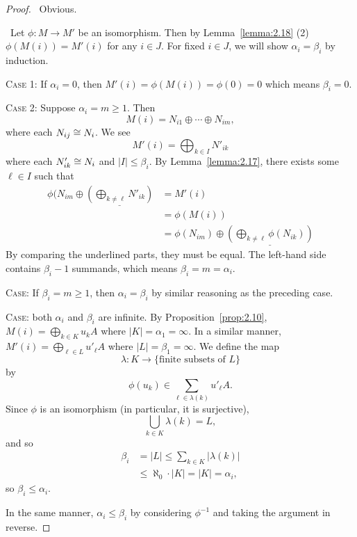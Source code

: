 \begin{proof}
\backwardproof\ Obvious.

\forwardproof\ Let $\phi\colon M\to M'$ be an isomorphism. Then by
Lemma~\ref{lemma:2.18} (2) $\phi(M(i))=M'(i)$ for any $i\in J$.
For fixed $i\in J$, we will show $\alpha_{i}=\beta_{i}$ by induction.

\textsc{Case 1}: If $\alpha_{i}=0$, then $M'(i)=\phi(M(i))=\phi(0)=0$
which means $\beta_{i}=0$.

\textsc{Case 2}: Suppose $\alpha_{i}=m\geq1$. Then
\begin{equation}
M(i)=N_{i1}\oplus\cdots\oplus N_{im},
\end{equation}
where each $N_{ij}\cong N_{i}$. We see
\begin{equation}
M'(i)=\bigoplus_{k\in I}N'_{ik}
\end{equation}
where each $N'_{ik}\cong N_{i}$ and $|I|\leq\beta_{i}$. By Lemma~\ref{lemma:2.17},
there exists some $\ell\in I$ such that
\begin{subequations}
  \begin{align}
\phi(N_{im}\oplus\underline{\left(\bigoplus_{k\neq\ell}N'_{ik}\right)}
&=M'(i)\\
&=\phi(M(i))\\
&=\phi(N_{im})\oplus\underline{\left(\bigoplus_{k\neq\ell}\phi(N_{ik})\right)}
  \end{align}
\end{subequations}
By comparing the underlined parts, they must be equal. The left-hand
side contains $\beta_{i}-1$ summands, which means $\beta_{i}=m=\alpha_{i}$.

\textsc{Case}: If $\beta_{i}=m\geq1$, then $\alpha_{i}=\beta_{i}$ by
similar reasoning as the preceding case.

\textsc{Case}: both $\alpha_{i}$ and $\beta_{i}$ are infinite. By
Proposition~\ref{prop:2.10}, $M(i)=\bigoplus_{k\in K}u_{k}A$ where
$|K|=\alpha_{1}=\infty$. In a similar manner,
$M'(i)=\bigoplus_{\ell\in L}u'_{\ell}A$ where $|L|=\beta_{1}=\infty$.
We define the map
\begin{equation}
\lambda\colon K\to\{\mbox{finite subsets of }L\}
\end{equation}
by
\begin{equation}
\phi(u_{k})\in\sum_{\ell\in\lambda(k)}u'_{\ell}A.
\end{equation}
Since $\phi$ is an isomorphism (in particular, it is surjective),
\begin{equation}
\bigcup_{k\in K}\lambda(k)=L,
\end{equation}
and so
\begin{subequations}
  \begin{align}
\beta_{i} &=|L|\leq\sum_{k\in K}|\lambda(k)|\\
&\leq\aleph_{0}\cdot|K|=|K|=\alpha_{i},
  \end{align}
\end{subequations}
so $\beta_{i}\leq\alpha_{i}$.

In the same manner, $\alpha_{i}\leq\beta_{i}$ by considering
$\phi^{-1}$ and taking the argument in reverse.
\end{proof}


